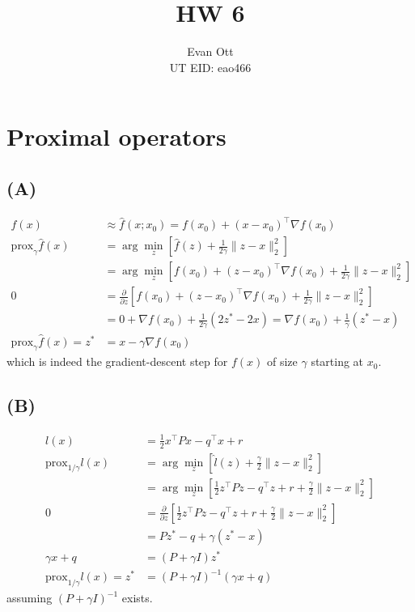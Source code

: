 \documentclass{article}
\title{\vspace{-6ex}HW 6\vspace{-2ex}}
\author{Evan Ott \\ UT EID: eao466\vspace{-2ex}}
\begin{document}
\maketitle
\section{Proximal operators}
\subsection{(A)}
\begin{align*}
f(x)&\approx \hat{f}(x;x_0)=f(x_0)+(x-x_0)^\top\nabla f(x_0)\\
\textrm{prox}_\gamma \hat{f}(x)&=\arg\min_z \left[ \hat{f}(z) + \frac{1}{2\gamma} \lVert z-x\rVert_2^2 \right]\\
&=\arg\min_z \left[ f(x_0)+(z-x_0)^\top\nabla f(x_0) + \frac{1}{2\gamma} \lVert z-x\rVert_2^2 \right]\\
0&=\frac{\partial}{\partial z}\left[ f(x_0)+(z-x_0)^\top\nabla f(x_0) + \frac{1}{2\gamma} \lVert z-x\rVert_2^2 \right]\\
&=0 + \nabla f(x_0) + \frac{1}{2\gamma}(2z^* - 2x)=\nabla f(x_0) + \frac{1}{\gamma}(z^* - x)\\
\textrm{prox}_\gamma \hat{f}(x)=z^*&=x-\gamma \nabla f(x_0)
\end{align*}
which is indeed the gradient-descent step for $f(x)$ of size $\gamma$ starting at $x_0$.

\subsection{(B)}
\begin{align*}
l(x)&=\frac{1}{2}x^\top P x - q^\top x + r\\
\textrm{prox}_{1/\gamma}l(x)&=\arg\min_z \left[ \hat{l}(z) + \frac{\gamma}{2} \lVert z-x\rVert_2^2 \right]\\
&= \arg\min_z \left[ \frac{1}{2}z^\top P z - q^\top z + r + \frac{\gamma}{2} \lVert z-x\rVert_2^2 \right]\\
0&=\frac{\partial}{\partial z}\left[ \frac{1}{2}z^\top P z - q^\top z + r + \frac{\gamma}{2} \lVert z-x\rVert_2^2 \right]\\
&=Pz^* - q + \gamma (z^* - x)\\
\gamma x + q&= \left(P + \gamma I\right) z^*\\
\textrm{prox}_{1/\gamma}l(x)=z^*&=\left(P + \gamma I\right)^{-1}(\gamma x + q)
\end{align*}
assuming $\left(P + \gamma I\right)^{-1}$ exists.
\end{document}
